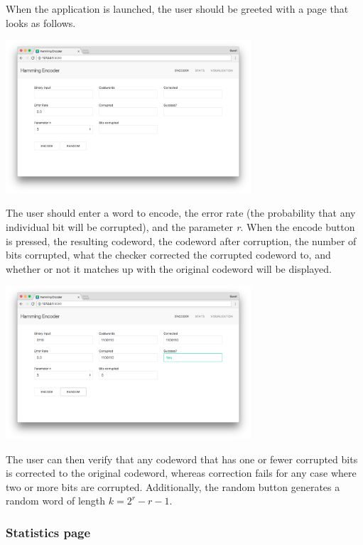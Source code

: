 \documentclass[11pt, oneside]{article}   	%
\begin{document}
When the application is launched, the user should be greeted with a page that looks as follows.

\begin{center}
\includegraphics[width=345px]{main_blank}
\end{center}


The user should enter a word to encode, the error rate (the probability that any individual bit will be corrupted), and the parameter \textit{r}. When the encode button is pressed, the resulting codeword, the codeword after corruption, the number of bits corrupted, what the checker corrected the corrupted codeword to, and whether or not it matches up with the original codeword will be displayed. 

\begin{center}
\includegraphics[width=345px]{main_code}
\end{center}

The user can then verify that any codeword that has one or fewer corrupted bits is corrected to the original codeword, whereas correction fails for any case where two or more bits are corrupted. Additionally, the random button generates a random word of length $k = 2^r - r - 1$. 

\subsubsection*{Statistics page}
\end{document}
